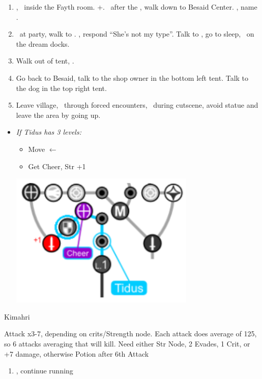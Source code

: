 \begin{enumerate}[resume]
	\item \cs[1:00], \sd\ inside the Fayth room. \fmv+\cs[1:00]. \sd\ after the \fmv, walk down to Besaid Center. \cs[1:40], name \valefor.
	\item \sd\ at party, walk to \yuna. \sd, respond ``She's not my type''. Talk to \wakka, go to sleep, \sd\ on the dream docks.
	\item Walk out of tent, \sd.
	\item Go back to Besaid, talk to the shop owner in the bottom left tent. Talk to the dog in the top right tent.
	\item Leave village, \sd\ through forced encounters, \sd\ during cutscene, avoid statue and leave the area by going up.
\end{enumerate}
\begin{spheregrid}
	\begin{itemize}
		\item \textit{If Tidus has 3 levels:}
		      \begin{itemize}
			      \item Move $\leftarrow$
			      \item Get Cheer, Str +1
		      \end{itemize}
		      \includegraphics{graphics/tiduscheer}
	\end{itemize}
\end{spheregrid}
\begin{battle}[750]{Kimahri}
	\begin{itemize}
		\tidusf Attack x3-7, depending on crits/Strength node.
		\tidusf Each attack does average of 125, so 6 attacks averaging that will kill.
		\tidusf Need either Str Node, 2 Evades, 1 Crit, or +7 damage, otherwise Potion after 6th Attack
	\end{itemize}
\end{battle}
\begin{enumerate}[resume]
	\item \sd, continue running
\end{enumerate}
